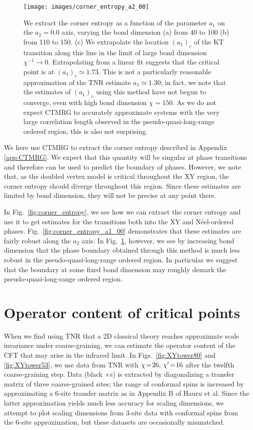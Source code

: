 \documentclass[aps,prb,letterpaper,superscriptaddress,twocolumn,showpacs,floatfix,10pt]{revtex4-1}
\begin{document}
\begin{figure}
\texttt{[image: images/corner\_entropy\_a2\_00]}
\caption{
We extract the corner entropy as a function of the parameter
$a_1$ on the $a_2=0.0$  axis,
varying the bond dimension (a) from 40 to 100  (b) from  110 to 150. 
(c) We extrapolate the location $(a_1)_c$ of the KT transition along this line
in the limit of large bond dimension $\chi^{-1} \to 0$.
Extrapolating from a linear fit suggests that
the critical point is at $(a_1)_c \simeq 1.73$.
This is not a particularly reasonable approximation of the TNR estimate
$a_1 \simeq 1.30$;
in fact, we note that the estimates of $(a_1)_c$ using this method have
not begun to converge, even with high bond dimension $\chi=150$. As we do not
expect CTMRG to accurately approximate systems with the very large correlation
length observed in the pseudo-quasi-long-range ordered region, this is also not
surprising.}
\label{fig:corner_entropy_a2_00}
\end{figure}

We here use CTMRG to extract the corner entropy described in Appendix
\ref{app:CTMRG}.
We expect that this quantity will be singular at phase transitions and therefore
can be used to predict the boundary of phases. However, we note that, as
the doubled vertex model is critical throughout the XY region,
the corner entropy should diverge throughout this region. Since these estimates
are limited by bond dimension, they will not be precise at any point there.

In Fig.~\ref{fig:corner_entropy}, we see how we can extract the corner entropy
and use it to get
estimates for the transitions both into the XY and N\'eel-ordered phases.
Fig.~\ref{fig:corner_entropy_a1_00} demonstrates that these estimates are
fairly robust along the $a_2$ axis.
In Fig.~\ref{fig:corner_entropy_a2_00}, however, we see by increasing bond
dimension that the phase boundary obtained through this method is much less
robust in the pseudo-quasi-long-range ordered region.  In
particular we suggest that the boundary at some fixed bond dimension may
roughly demark the pseudo-quasi-long-range ordered region.

\FloatBarrier
\section{Operator content of critical points}
\label{app:tower}



When we find using TNR that a 2D classical theory reaches approximate scale
invariance under coarse-graining, we can estimate the operator content of the
CFT that may arise in the infrared limit.  In Figs.~\ref{fig:XYtower80} and
\ref{fig:XYtower53}, we use data from TNR with $\chi\nobreak\!=\nobreak\!26, \,\chi'\nobreak\!=\nobreak\!16$ after the
twelfth coarse-graining step. Data (black
$\times$s) is extracted by diagonalizing a transfer matrix of three coarse-grained
sites; the range of conformal spins is increased by approximating a 6-site
transfer matrix as in Appendix B of Hauru et al.\cite{TNRHauru}
Since the latter approximation
yields much less accuracy for scaling dimensions, we attempt to plot scaling
dimensions from 3-site data with conformal spins from the 6-site approximation,
but these datasets are occasionally mismatched.
\end{document}
